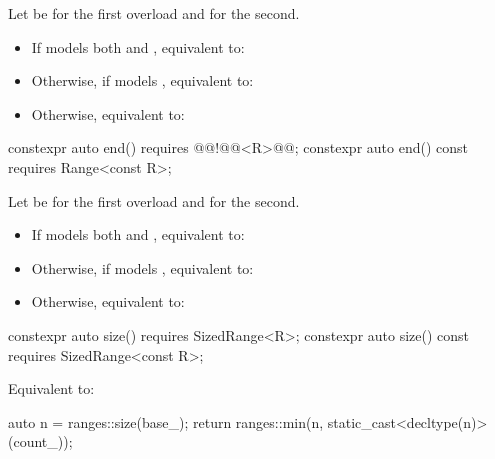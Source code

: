 \begin{addedblock}
\begin{itemdescr}
\pnum
Let  be  for the first overload and  for the
second.

\pnum
\effects
\begin{itemize}
\item If  models both  and
  , equivalent to:
\item Otherwise, if  models , equivalent to:
\item Otherwise, equivalent to:
\end{itemize}
\end{itemdescr}

%
\begin{itemdecl}
constexpr auto end() requires @\newtxt{(}@!@@<R>@\newtxt{)}@;
constexpr auto end() const requires Range<const R>;
\end{itemdecl}

\begin{itemdescr}
\pnum
Let  be  for the first overload and  for the
second.

\pnum
\effects
\begin{itemize}
\item If  models both  and
  , equivalent to:
\item Otherwise, if  models , equivalent to:
\item Otherwise, equivalent to:
\end{itemize}
\end{itemdescr}

%
\begin{itemdecl}
constexpr auto size() requires SizedRange<R>;
constexpr auto size() const requires SizedRange<const R>;
\end{itemdecl}

\begin{itemdescr}
\pnum
\effects Equivalent to:
\begin{codeblock}
auto n = ranges::size(base_);
return ranges::min(n, static_cast<decltype(n)>(count_));
\end{codeblock}
\end{itemdescr}


\end{addedblock}
